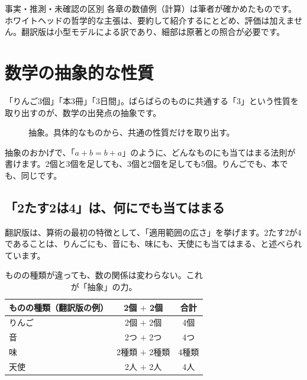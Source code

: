 \documentclass[a4paper,11pt,openany]{ltjsbook}
\begin{document}
\begin{notebox}{事実・推測・未確認の区別}
各章の数値例（計算）は筆者が確かめたものです。ホワイトヘッドの哲学的な主張は、要約して紹介するにとどめ、評価は加えません。翻訳版は小型モデルによる訳であり、細部は原著との照合が必要です。
\end{notebox}

\chapter{数学の抽象的な性質}

「りんご3個」「本3冊」「3日間」。ばらばらのものに共通する「3」という性質を取り出すのが、数学の出発点の抽象です。

\begin{figure}[htbp]
\centering
{}
\caption{抽象。具体的なものから、共通の性質だけを取り出す。}
\end{figure}

抽象のおかげで、「$a+b=b+a$」のように、どんなものにも当てはまる法則が書けます。2個と3個を足しても、3個と2個を足しても5個。りんごでも、本でも、同じです。


\section{「2たす2は4」は、何にでも当てはまる}

翻訳版は、算術の最初の特徴として、「適用範囲の広さ」を挙げます。2たす2が4であることは、りんごにも、音にも、味にも、天使にも当てはまる、と述べられています。

\begin{table}[htbp]
\centering
\begin{tabular}{lcc}
\toprule
ものの種類（翻訳版の例） & 2個 $+$ 2個 & 合計\\
\midrule
りんご & 2個 $+$ 2個 & 4個\\
音 & 2つ $+$ 2つ & 4つ\\
味 & 2種類 $+$ 2種類 & 4種類\\
天使 & 2人 $+$ 2人 & 4人\\
\bottomrule
\end{tabular}
\caption{ものの種類が違っても、数の関係は変わらない。これが「抽象」の力。}
\end{table}
\end{document}

